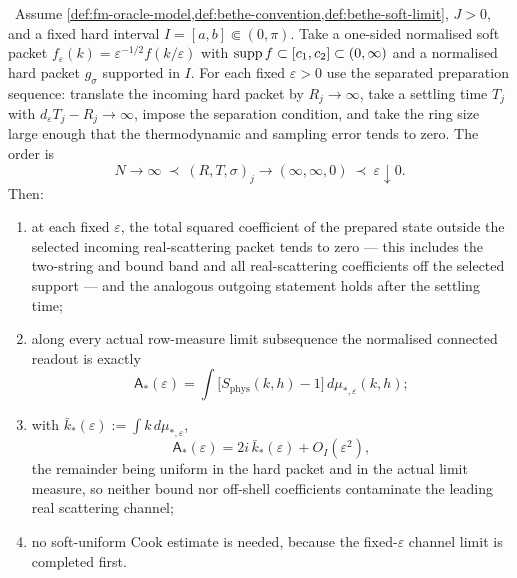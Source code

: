 \begin{theorem}
\label{thm:ml6-hs-sep}
\statusProved\ Assume \cref{def:fm-oracle-model,def:bethe-convention,def:bethe-soft-limit},
$J>0$, and a fixed hard interval $I=[a,b]\Subset(0,\pi)$. Take a one-sided
normalised soft packet $f_\varepsilon(k)=\varepsilon^{-1/2}f(k/\varepsilon)$
with $\operatorname{supp} f\subset[c_1,c_2]\subset(0,\infty)$ and a normalised hard packet
$g_\sigma$ supported in $I$. For each fixed $\varepsilon>0$ use the separated
preparation sequence: translate the incoming hard packet by $R_j\to\infty$,
take a settling time $T_j$ with $d_\varepsilon T_j-R_j\to\infty$, impose the
separation condition, and take the ring size large enough that the
thermodynamic and sampling error tends to zero. The order is
\begin{equation}
  N\to\infty\ \prec\ (R,T,\sigma)_j\to(\infty,\infty,0)\ \prec\ \varepsilon\downarrow0 .
  \label{eq:l6-order}
\end{equation}
Then:
\begin{enumerate}
\item at each fixed $\varepsilon$, the total squared coefficient of the
  prepared state outside the selected incoming real-scattering packet tends to
  zero --- this includes the two-string and bound band and all
  real-scattering coefficients off the selected support --- and the analogous
  outgoing statement holds after the settling time;
\item along every actual row-measure limit subsequence the normalised
  connected readout is exactly
  \begin{equation}
    \mathsf{A}_*(\varepsilon)
     =\int\bigl[S_{\mathrm{phys}}(k,h)-1\bigr]\,d\mu_{*,\varepsilon}(k,h);
    \label{eq:hs-sep-readout}
  \end{equation}
\item with $\bar k_*(\varepsilon):=\int k\,d\mu_{*,\varepsilon}$,
  \begin{equation}
    \mathsf{A}_*(\varepsilon)=2i\,\bar k_*(\varepsilon)+O_I(\varepsilon^2),
  \end{equation}
  the remainder being uniform in the hard packet and in the actual limit
  measure, so neither bound nor off-shell coefficients contaminate the leading
  real scattering channel;
\item no soft-uniform Cook estimate is needed, because the fixed-$\varepsilon$
  channel limit is completed first.
\end{enumerate}
\end{theorem}
